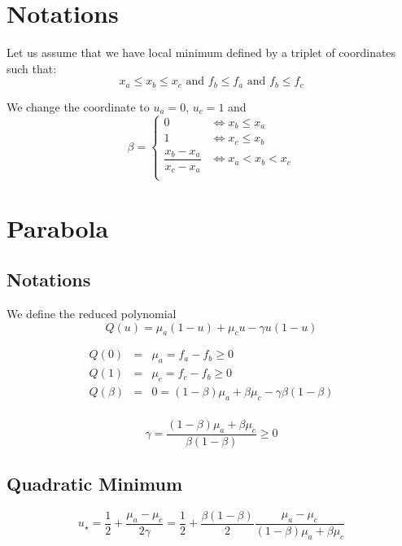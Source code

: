 \documentclass[aps,12pt]{revtex4}
\begin{document}
\section{Notations}
Let us assume that we have local minimum defined by a triplet of coordinates such that:
\begin{equation}
	x_a \leq x_b \leq x_c \text{ and } f_b \leq f_a \text{ and } f_b \leq f_c
\end{equation}

We change the coordinate to $u_a=0$, $u_c=1$ and
\begin{equation}
	\beta = \left\lbrace
	\begin{array}{cc}
	0 & \iff  x_b\leq x_a\\
	1 & \iff  x_c\leq x_b\\
	\dfrac{x_b-x_a}{x_c-x_a} & \iff x_a < x_b < x_c\\
	\end{array}
	\right.
\end{equation}

\section{Parabola}
\subsection{Notations}
We define the reduced polynomial
\begin{equation}
	Q(u) =  \mu_a (1-u) + \mu_c u - \gamma u(1-u)
\end{equation}	 
 
\begin{equation}
\begin{array}{rcl}
	Q(0) & = & \mu_a = f_a - f_b \geq 0\\
	Q(1) & = & \mu_c = f_c - f_b \geq 0\\
	Q(\beta) & = & 0 = (1-\beta)\mu_a + \beta \mu_c - \gamma \beta(1-\beta)\\
\end{array}
\end{equation}	

\begin{equation}
	\gamma = \dfrac{(1-\beta)\mu_a + \beta \mu_c}{\beta(1-\beta)}  \geq 0 
\end{equation}

\subsection{Quadratic Minimum}
\begin{equation}
\boxed{
	u_\star = \dfrac{1}{2} + \dfrac{\mu_a-\mu_c}{2\gamma} = \dfrac{1}{2} + \dfrac{\beta(1-\beta)}{2} 
	\dfrac{\mu_a-\mu_c}{(1-\beta)\mu_a + \beta \mu_c}
	}
\end{equation}
\end{document}
